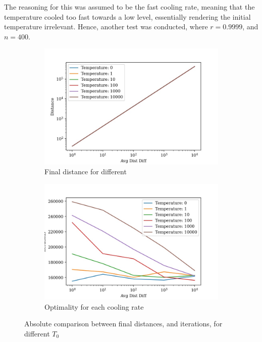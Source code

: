 \documentclass{article}
\begin{document}
The reasoning for this was assumed to be the fast cooling rate, meaning that the temperature cooled too fast towards a low level, essentially rendering the initial temperature irrelevant.
Hence, another test was conducted, where $r = 0.9999$, and $n = 400$.

\begin{figure}[H]
    \centering
    \begin{subfigure}{0.45\textwidth}
        \centering
        \includegraphics[width=1\linewidth]{images/rand_temperature_avg_dist_diff_distance.jpg}
        \caption{Final distance for different }
        \label{fig:sub1}
    \end{subfigure}%
    \begin{subfigure}{0.45\textwidth}
        \centering
        \includegraphics[width=1\linewidth]{images/rand_temperature_avg_dist_diff_iterations.jpg}
        \caption{Optimality for each cooling rate}
        \label{fig:sub2}
    \end{subfigure}
    \captionsetup{justification=centering}
    \caption{Absolute comparison between final distances, and iterations, for different $T_0$}
\end{figure}
\end{document}
